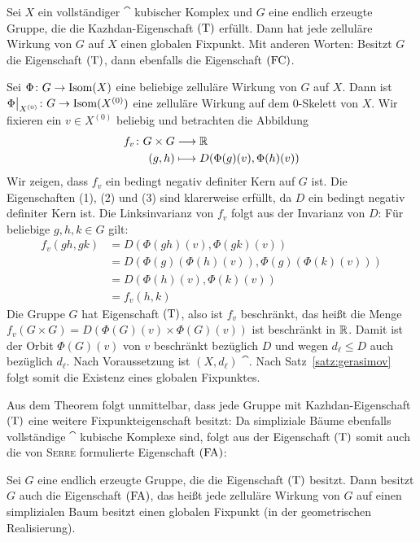 \begin{theo}
\label{thm:kap3}
	Sei $X$ ein vollständiger $\cat$ kubischer Komplex und $G$ eine endlich erzeugte Gruppe, die die Kazhdan-Eigenschaft $\operatorname{(T)}$ erfüllt. Dann hat jede zelluläre Wirkung von $G$ auf $X$ einen globalen Fixpunkt. Mit anderen Worten:
	Besitzt $G$ die Eigenschaft $\operatorname{(T)}$, dann ebenfalls die Eigenschaft $\operatorname{(FC)}$.
\end{theo}
\newpage
\begin{beweis}
	Sei $\Phi\colon G \rightarrow \operatorname{Isom}(X)$ eine beliebige zelluläre Wirkung von $G$ auf $X$. Dann ist $\Phi\big|_{X^{(0)}}\colon G \rightarrow \operatorname{Isom}(X^{(0)})$ eine zelluläre Wirkung auf dem $0$-Skelett von $X$. Wir fixieren ein $v \in X^{(0)}$ beliebig und betrachten die Abbildung
	\begin{equation}
	\begin{aligned}
	f_v\colon G \times G &\longrightarrow \mathbb{R} \\
	(g,h) &\longmapsto D(\Phi(g)(v),\Phi(h)(v))
	\end{aligned}
	\end{equation}
	Wir zeigen, dass $f_v$ ein bedingt negativ definiter Kern auf $G$ ist. Die Eigenschaften (1), (2) und (3) sind klarerweise erfüllt, da $D$ ein bedingt negativ definiter Kern ist. Die Linksinvarianz von $f_v$ folgt aus der Invarianz von $D$: Für beliebige $g,h,k \in G$ gilt:
	\begin{equation}
	\begin{aligned}
	f_v(gh,gk) &= D(\Phi(gh)(v),\Phi(gk)(v)) \\
	&= D(\Phi(g)(\Phi(h)(v)),\Phi(g)(\Phi(k)(v))) \\
	&= D(\Phi(h)(v),\Phi(k)(v)) \\
	&= f_v(h,k)
	\end{aligned}
	\end{equation}
	Die Gruppe $G$ hat Eigenschaft $\operatorname{(T)}$, also ist $f_v$ beschränkt, das heißt die Menge
	$f_v(G \times G) = D(\Phi(G)(v) \times \Phi(G)(v))$ ist beschränkt in $\mathbb{R}$. Damit ist der Orbit $\Phi(G)(v)$ von $v$ beschränkt bezüglich $D$ und wegen $d_\ell \leq D$ auch bezüglich $d_\ell$. Nach Voraussetzung ist $(X,d_\ell)$ $\cat$. Nach Satz~\ref{satz:gerasimov} folgt somit die Existenz eines globalen Fixpunktes.
\end{beweis}

Aus dem Theorem folgt unmittelbar, dass jede Gruppe mit Kazhdan-Eigenschaft $\operatorname{(T)}$ eine weitere Fixpunkteigenschaft besitzt: Da simpliziale Bäume ebenfalls vollständige $\cat$ kubische Komplexe sind, folgt aus der Eigenschaft $\operatorname{(T)}$ somit auch die von \textsc{Serre} formulierte Eigenschaft $\operatorname{(FA)}$:

\begin{korollar}
	Sei $G$ eine endlich erzeugte Gruppe, die die Eigenschaft $\operatorname{(T)}$ besitzt. Dann besitzt $G$ auch die Eigenschaft $\operatorname{(FA)}$, das heißt jede zelluläre Wirkung von $G$ auf einen simplizialen Baum besitzt einen globalen Fixpunkt (in der geometrischen Realisierung).
\end{korollar}

\cleardoubleoddemptypage